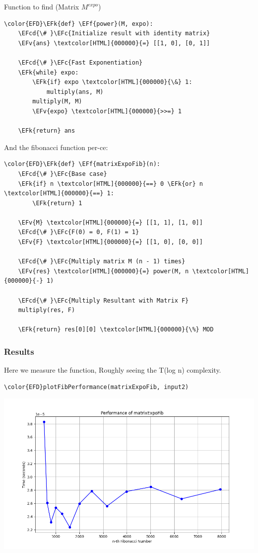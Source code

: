 \documentclass[a4paper,12pt]{article}
\newcommand{\EFc}[1]{\textcolor{EFc}{#1}} %
\newcommand{\EFcd}[1]{\textcolor{EFcd}{#1}} %
\newcommand{\EFk}[1]{\textcolor{EFk}{#1}} %
\newcommand{\EFf}[1]{\textcolor{EFf}{#1}} %
\newcommand{\EFv}[1]{\textcolor{EFv}{#1}} %
\begin{document}
Function to find (Matrix \(M ^{expo}\))
\begin{Code}
\begin{Verbatim}
\color{EFD}\EFk{def} \EFf{power}(M, expo):
    \EFcd{\# }\EFc{Initialize result with identity matrix}
    \EFv{ans} \textcolor[HTML]{000000}{=} [[1, 0], [0, 1]]

    \EFcd{\# }\EFc{Fast Exponentiation}
    \EFk{while} expo:
        \EFk{if} expo \textcolor[HTML]{000000}{\&} 1:
            multiply(ans, M)
        multiply(M, M)
        \EFv{expo} \textcolor[HTML]{000000}{>>=} 1

    \EFk{return} ans
\end{Verbatim}
\end{Code}

And the fibonacci function per-ce:
\begin{Code}
\begin{Verbatim}
\color{EFD}\EFk{def} \EFf{matrixExpoFib}(n):
    \EFcd{\# }\EFc{Base case}
    \EFk{if} n \textcolor[HTML]{000000}{==} 0 \EFk{or} n \textcolor[HTML]{000000}{==} 1:
        \EFk{return} 1

    \EFv{M} \textcolor[HTML]{000000}{=} [[1, 1], [1, 0]]
    \EFcd{\# }\EFc{F(0) = 0, F(1) = 1}
    \EFv{F} \textcolor[HTML]{000000}{=} [[1, 0], [0, 0]]

    \EFcd{\# }\EFc{Multiply matrix M (n - 1) times}
    \EFv{res} \textcolor[HTML]{000000}{=} power(M, n \textcolor[HTML]{000000}{-} 1)

    \EFcd{\# }\EFc{Multiply Resultant with Matrix F}
    multiply(res, F)

    \EFk{return} res[0][0] \textcolor[HTML]{000000}{\%} MOD
\end{Verbatim}
\end{Code}
\subsubsection{Results}
\label{sec:orgca12f6c}
Here we measure the function, Roughly seeing the T(log n) complexity.
\begin{Code}
\begin{Verbatim}
\color{EFD}plotFibPerformance(matrixExpoFib, input2)
\end{Verbatim}
\end{Code}

\begin{center}
\includegraphics[width=.9\linewidth]{matrixExpoFib.png}
\label{org4254972}
\end{center}
\end{document}
